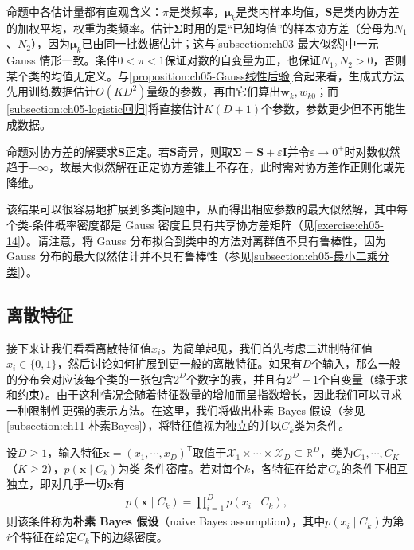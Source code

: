\documentclass[../../main.tex]{subfiles}
\begin{document}
\begin{remark}
命题中各估计量都有直观含义：$\pi$是类频率，$\boldsymbol{\mu}_k$是类内样本均值，$\boldsymbol{S}$是类内协方差的加权平均，权重为类频率。估计$\boldsymbol{\Sigma}$时用的是“已知均值”的样本协方差（分母为$N_1$、$N_2$），因为$\boldsymbol{\mu}_k$已由同一批数据估计；这与\cref{subsection:ch03-最大似然}中一元 Gauss 情形一致。条件$0<\pi<1$保证对数的自变量为正，也保证$N_1,N_2>0$，否则某个类的均值无定义。与\cref{proposition:ch05-Gauss线性后验}合起来看，生成式方法先用训练数据估计$O(KD^{2})$量级的参数，再由它们算出$\boldsymbol{w}_k,w_{k0}$；而\cref{subsection:ch05-logistic回归}将直接估计$K(D+1)$个参数，参数更少但不再能生成数据。

命题对协方差的解要求$\boldsymbol{S}$正定。若$\boldsymbol{S}$奇异，则取$\boldsymbol{\Sigma}=\boldsymbol{S}+\varepsilon\boldsymbol{I}$并令$\varepsilon\to0^{+}$时对数似然趋于$+\infty$，故最大似然解在正定协方差锥上不存在，此时需对协方差作正则化或先降维。
\end{remark}

该结果可以很容易地扩展到多类问题中，从而得出相应参数的最大似然解，其中每个类-条件概率密度都是 Gauss 密度且具有共享协方差矩阵（见\cref{exercise:ch05-14}）。请注意，将 Gauss 分布拟合到类中的方法对离群值不具有鲁棒性，因为 Gauss 分布的最大似然估计并不具有鲁棒性（参见\cref{subsection:ch05-最小二乘分类}）。

\subsection{离散特征}\label{subsection:ch05-离散特征}

接下来让我们看看离散特征值$x_i$。为简单起见，我们首先考虑二进制特征值$x_i\in\{0,1\}$，然后讨论如何扩展到更一般的离散特征。如果有$D$个输入，那么一般的分布会对应该每个类的一张包含$2^{D}$个数字的表，并且有$2^{D}-1$个自变量（缘于求和约束）。由于这种情况会随着特征数量的增加而呈指数增长，因此我们可以寻求一种限制性更强的表示方法。在这里，我们将做出朴素 Bayes 假设（参见\cref{subsection:ch11-朴素Bayes}），将特征值视为独立的并以$C_k$类为条件。

\begin{definition}[朴素 Bayes 假设]\label{definition:ch05-朴素Bayes假设}
设$D\geqslant1$，输入特征$\boldsymbol{x}=(x_1,\cdots,x_D)^{\mathsf{T}}$取值于$\mathcal{X}_1\times\cdots\times\mathcal{X}_D\subseteq\mathbb{R}^{D}$，类为$C_1,\cdots,C_K$（$K\geqslant2$），$p(\boldsymbol{x}\mid C_k)$为类-条件密度。若对每个$k$，各特征在给定$C_k$的条件下相互独立，即对几乎一切$\boldsymbol{x}$有
\begin{align}
  p(\boldsymbol{x}\mid C_k)=\prod_{i=1}^{D}p(x_i\mid C_k),
\end{align}
则该条件称为\textbf{朴素 Bayes 假设}（naive Bayes assumption），其中$p(x_i\mid C_k)$为第$i$个特征在给定$C_k$下的边缘密度。
\end{definition}
\end{document}
